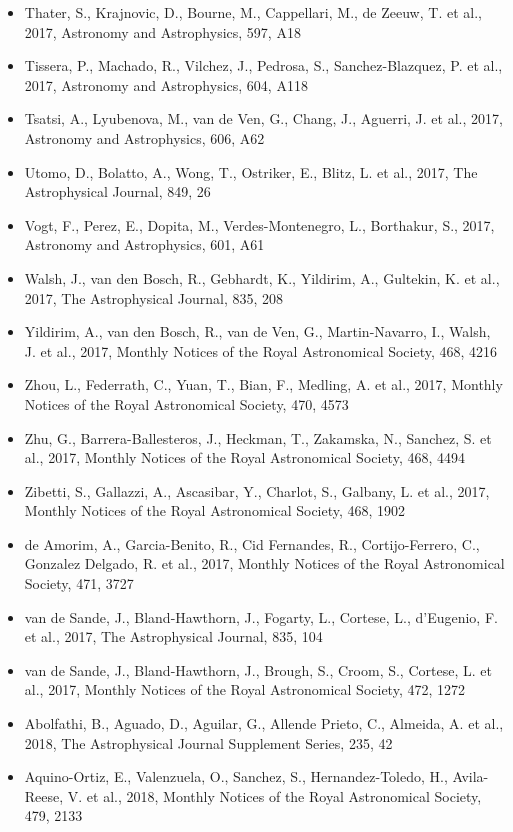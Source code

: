 \documentclass{letter}
\begin{document}
\begin{enumerate}
\begin{itemize}
\item Thater, S., Krajnovic, D., Bourne, M., Cappellari, M., de Zeeuw, T. et al., 2017, Astronomy and Astrophysics, 597, A18
\item Tissera, P., Machado, R., Vilchez, J., Pedrosa, S., Sanchez-Blazquez, P. et al., 2017, Astronomy and Astrophysics, 604, A118
\item Tsatsi, A., Lyubenova, M., van de Ven, G., Chang, J., Aguerri, J. et al., 2017, Astronomy and Astrophysics, 606, A62
\item Utomo, D., Bolatto, A., Wong, T., Ostriker, E., Blitz, L. et al., 2017, The Astrophysical Journal, 849, 26
\item Vogt, F., Perez, E., Dopita, M., Verdes-Montenegro, L., Borthakur, S., 2017, Astronomy and Astrophysics, 601, A61
\item Walsh, J., van den Bosch, R., Gebhardt, K., Yildirim, A., Gultekin, K. et al., 2017, The Astrophysical Journal, 835, 208
\item Yildirim, A., van den Bosch, R., van de Ven, G., Martin-Navarro, I., Walsh, J. et al., 2017, Monthly Notices of the Royal Astronomical Society, 468, 4216
\item Zhou, L., Federrath, C., Yuan, T., Bian, F., Medling, A. et al., 2017, Monthly Notices of the Royal Astronomical Society, 470, 4573
\item Zhu, G., Barrera-Ballesteros, J., Heckman, T., Zakamska, N., Sanchez, S. et al., 2017, Monthly Notices of the Royal Astronomical Society, 468, 4494
\item Zibetti, S., Gallazzi, A., Ascasibar, Y., Charlot, S., Galbany, L. et al., 2017, Monthly Notices of the Royal Astronomical Society, 468, 1902
\item de Amorim, A., Garcia-Benito, R., Cid Fernandes, R., Cortijo-Ferrero, C., Gonzalez Delgado, R. et al., 2017, Monthly Notices of the Royal Astronomical Society, 471, 3727
\item van de Sande, J., Bland-Hawthorn, J., Fogarty, L., Cortese, L., d'Eugenio, F. et al., 2017, The Astrophysical Journal, 835, 104
\item van de Sande, J., Bland-Hawthorn, J., Brough, S., Croom, S., Cortese, L. et al., 2017, Monthly Notices of the Royal Astronomical Society, 472, 1272
\item Abolfathi, B., Aguado, D., Aguilar, G., Allende Prieto, C., Almeida, A. et al., 2018, The Astrophysical Journal Supplement Series, 235, 42
\item Aquino-Ortiz, E., Valenzuela, O., Sanchez, S., Hernandez-Toledo, H., Avila-Reese, V. et al., 2018, Monthly Notices of the Royal Astronomical Society, 479, 2133

\end{itemize}
\end{enumerate}
\end{document}
